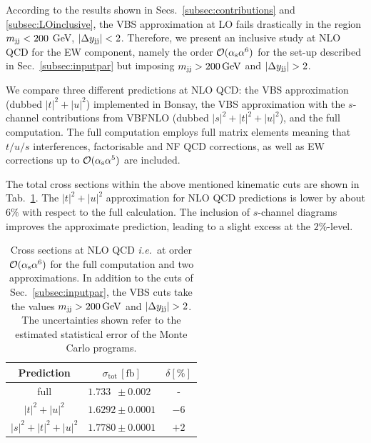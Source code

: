 According to the results shown in Secs.~\ref{subsec:contributions} and \ref{subsec:LOinclusive}, the VBS approximation at LO fails drastically in the region $m_{\text{j}\text{j}} < 200$ GeV, $|\Delta y_{\text{j}\text{j}}| < 2$.
Therefore, we present an inclusive study at NLO QCD for the EW component, namely the order $\mathcal{O}(\alpha_\text{s}\alpha^6)$ for the set-up described in Sec.~\ref{subsec:inputpar} but imposing $m_{\text{j}\text{j}}>200 \,\text{GeV}$ and $|\Delta y_{\Pj\Pj}|>2$.



We compare three different predictions at NLO QCD: 
the VBS approximation (dubbed $|t|^2+|u|^2$) implemented in {\sc Bonsay}, the VBS approximation with the $s$-channel contributions from {\sc VBFNLO} (dubbed $|s|^2+|t|^2+|u|^2$), and the full computation.
The full computation employs full matrix elements meaning that $t/u/s$ interferences, factorisable and NF QCD corrections, as well as EW corrections up to $\mathcal{O}(\alpha_\text{s} \alpha^5)$ are included.

The total cross sections within the above mentioned kinematic cuts are shown in Tab.~\ref{tab:crosssecINCLUSIVE}.
The $|t|^2+|u|^2$ approximation for NLO QCD predictions is lower by about $6\%$ with respect to the full calculation.
The inclusion of $s$-channel diagrams improves the approximate prediction, leading to a slight excess at the $2\%$-level.

\begin{table}[h!]
\centering
\begin{tabular}{c|c|c}
Prediction & $\sigma_{\textrm{tot}}\,[\textrm{fb}]$ & $\delta [\%]$ \\
\hline
\hline
full &  $1.733\phantom{0} \pm 0.002\phantom{0}$ & - \\
\hline
$|t|^2 + |u|^2$ & $1.6292 \pm 0.0001$  &  $-6$ \\
\hline
$|s|^2 + |t|^2 + |u|^2$ & $1.7780 \pm 0.0001$  & $+2$
\end{tabular}
\caption{Cross sections at NLO QCD \emph{i.e.}\ at order $\mathcal{O}(\alpha_\text{s}\alpha^6)$ for the full computation and two approximations.
In addition to the cuts of Sec.~\ref{subsec:inputpar}, the VBS cuts take the values $m_{\text{j}\text{j}}>200 \,\text{GeV}$ and $|\Delta y_{\Pj\Pj}|>2$.
The uncertainties shown refer to the estimated statistical error of the Monte Carlo programs.}
\label{tab:crosssecINCLUSIVE}
\end{table}


